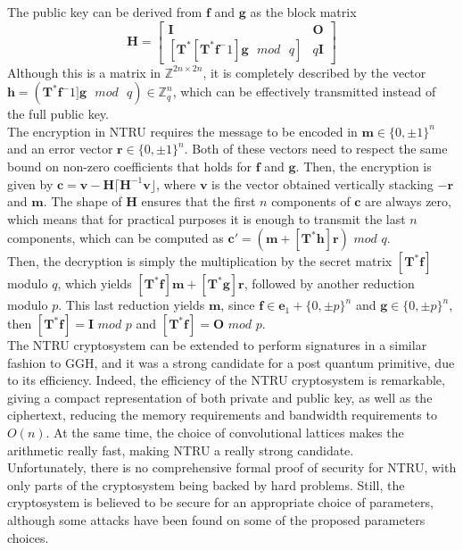 The public key can be derived from $\mathbf{f}$ and $\mathbf{g}$  as the block matrix
\begin{equation*}
\mathbf{H}=
\begin{bmatrix}
\mathbf{I} & \mathbf{O} \\
[\mathbf{T}^*[\mathbf{T}^*\mathbf{f}^-1]\mathbf{g}\text{ }mod\text{ }q] & q\mathbf{I}
\end{bmatrix}
\end{equation*}
Although this is a matrix in $\mathbb{Z}^{2n\times 2n}$, it is completely described by the vector $\mathbf{h}=(\mathbf{T}^*\mathbf{f}^-1]\mathbf{g}\text{ }mod\text{ }q)\in\mathbb{Z}_q^n$, which can be effectively transmitted instead of the full public key.\\
The encryption in NTRU requires the message to be encoded in $\mathbf{m}\in\{0,\pm1\}^n$ and an error vector $\mathbf{r}\in\{0,\pm1\}^n$. Both of these vectors need to respect the same bound on non-zero coefficients that holds for $\mathbf{f}$ and $\mathbf{g}$. Then, the encryption is given by $\mathbf{c}=\mathbf{v}-\mathbf{H}\lceil\mathbf{H}^{-1}\mathbf{v}\rfloor$, where $\mathbf{v}$ is the vector obtained vertically stacking $-\mathbf{r}$ and $\mathbf{m}$. The shape of $\mathbf{H}$ ensures that the first $n$ components of $\mathbf{c}$ are always zero, which means that for practical purposes it is enough to transmit the last $n$ components, which can be computed as $\mathbf{c}'=(\mathbf{m}+[\mathbf{T}^*\mathbf{h}]\mathbf{r})$ $mod$ $q$.\\
Then, the decryption is simply the multiplication by the secret matrix $[\mathbf{T}^*\mathbf{f}]$ modulo $q$, which yields $[\mathbf{T}^*\mathbf{f}]\mathbf{m} + [\mathbf{T}^*\mathbf{g}]\mathbf{r}$, followed by another reduction modulo $p$. This last reduction yields $\mathbf{m}$, since $\mathbf{f}\in\mathbf{e}_1+\{0,\pm p\}^n$ and $\mathbf{g}\in\{0,\pm p\}^n$, then $[\mathbf{T}^*\mathbf{f}]=\mathbf{I}$ $mod$ $p$ and $[\mathbf{T}^*\mathbf{f}]=\mathbf{O}$ $mod$ $p$.\\
The NTRU cryptosystem can be extended to perform signatures in a similar fashion to GGH, and it was a strong candidate for a post quantum primitive, due to its efficiency. Indeed, the efficiency of the NTRU cryptosystem is remarkable, giving a compact representation of both private and public key, as well as the ciphertext, reducing the memory requirements and bandwidth requirements to $O(n)$. At the same time, the choice of convolutional lattices makes the arithmetic really fast, making NTRU a really strong candidate.\\
Unfortunately, there is no comprehensive formal proof of security for NTRU, with only parts of the cryptosystem being backed by hard problems. Still, the cryptosystem is believed to be secure for an appropriate choice of parameters, although some attacks have been found on some of the proposed parameters choices.

